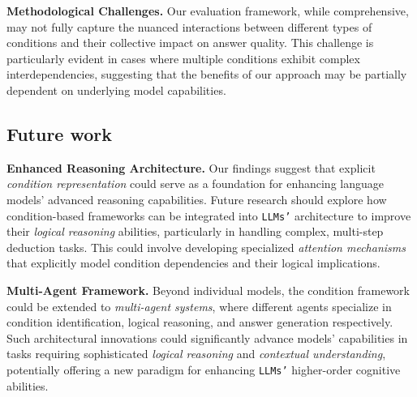 \textbf{Methodological Challenges.} Our evaluation framework, while comprehensive, may not fully capture the nuanced interactions between different types of conditions and their collective impact on answer quality. This challenge is particularly evident in cases where multiple conditions exhibit complex interdependencies, suggesting that the benefits of our approach may be partially dependent on underlying model capabilities.

\subsection{Future work}
\textbf{Enhanced Reasoning Architecture.} Our findings suggest that explicit \textit{condition representation} could serve as a foundation for enhancing language models' advanced reasoning capabilities. Future research should explore how condition-based frameworks can be integrated into \texttt{LLMs'} architecture to improve their \textit{logical reasoning} abilities, particularly in handling complex, multi-step deduction tasks. This could involve developing specialized \textit{attention mechanisms} that explicitly model condition dependencies and their logical implications.

\textbf{Multi-Agent Framework.} Beyond individual models, the condition framework could be extended to \textit{multi-agent systems}, where different agents specialize in condition identification, logical reasoning, and answer generation respectively. Such architectural innovations could significantly advance models' capabilities in tasks requiring sophisticated \textit{logical reasoning} and \textit{contextual understanding}, potentially offering a new paradigm for enhancing \texttt{LLMs'} higher-order cognitive abilities.